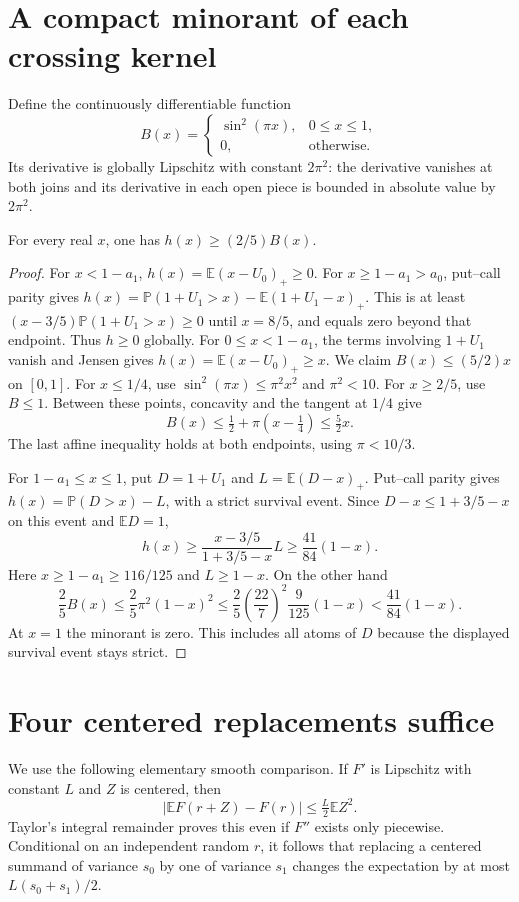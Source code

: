 \documentclass[11pt]{article}
\newcommand{\E}{\mathbb E}\newcommand{\Pp}{\mathbb P}
\begin{document}
\section{A compact minorant of each crossing kernel}
Define the continuously differentiable function
\[
B(x)=
\begin{cases}\sin^2(\pi x),&0\le x\le1,\\0,&\text{otherwise}.\end{cases}
\]
Its derivative is globally Lipschitz with constant $2\pi^2$:
the derivative vanishes at both joins and its derivative in each open
piece is bounded in absolute value by $2\pi^2$.

\begin{lemma}\label{lem:bump}
For every real $x$, one has $h(x)\ge(2/5)B(x)$.
\end{lemma}
\begin{proof}
For $x<1-a_1$, $h(x)=\E(x-U_0)_+\ge0$. For $x\ge1-a_1>a_0$,
put--call parity gives $h(x)=\Pp(1+U_1>x)-\E(1+U_1-x)_+$.
This is at least $(x-3/5)\Pp(1+U_1>x)\ge0$ until $x=8/5$,
and equals zero beyond that endpoint. Thus $h\ge0$ globally.
For $0\le x<1-a_1$, the terms involving $1+U_1$ vanish and Jensen gives
$h(x)=\E(x-U_0)_+\ge x$. We claim $B(x)\le(5/2)x$ on $[0,1]$.
For $x\le1/4$, use $\sin^2(\pi x)\le\pi^2x^2$ and $\pi^2<10$.
For $x\ge2/5$, use $B\le1$. Between these points, concavity and the
tangent at $1/4$ give
\[
B(x)\le\tfrac12+\pi(x-\tfrac14)\le\tfrac52x.
\]
The last affine inequality holds at both endpoints, using $\pi<10/3$.

For $1-a_1\le x\le1$, put $D=1+U_1$ and $L=\E(D-x)_+$.
Put--call parity gives $h(x)=\Pp(D>x)-L$, with a strict survival event.
Since $D-x\le1+3/5-x$ on this event and $\E D=1$,
\[
h(x)\ge\frac{x-3/5}{1+3/5-x}L
\ge\frac{41}{84}(1-x).
\]
Here $x\ge1-a_1\ge116/125$ and $L\ge1-x$.
On the other hand
\[
\frac25B(x)\le\frac25\pi^2(1-x)^2
\le\frac25\left(\frac{22}{7}\right)^2\frac9{125}(1-x)
<\frac{41}{84}(1-x).
\]
At $x=1$ the minorant is zero. This includes all atoms of $D$ because
the displayed survival event stays strict.
\end{proof}

\section{Four centered replacements suffice}
We use the following elementary smooth comparison. If $F'$ is Lipschitz
with constant $L$ and $Z$ is centered, then
\[
|\E F(r+Z)-F(r)|\le \tfrac L2\E Z^2.
\]
Taylor's integral remainder proves this even if $F''$ exists only
piecewise. Conditional on an independent random $r$, it follows that
replacing a centered summand of variance $s_0$ by one of variance $s_1$
changes the expectation by at most $L(s_0+s_1)/2$.
\end{document}
